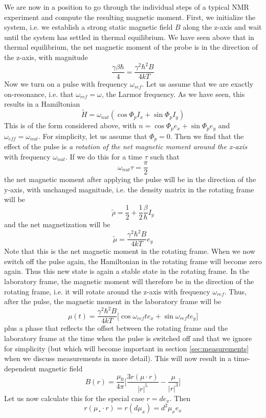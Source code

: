\documentclass[a4paper, draft]{article}
\theoremstyle{own}
\theoremstyle{remark}
\begin{document}
We are now in a position to go through the individual steps of a typical NMR experiment and compute the resulting magnetic moment. First, we initialize the system, i.e. we establish a strong static magnetic field $B$ along the z-axis and wait until the system has settled in thermal equilibrium. We have seen above that in thermal equilibrium, the net magnetic moment of the probe is in the direction of the z-axis, with magnitude
$$
\frac{\gamma \beta \hbar}{4} = \frac{\gamma^2 \hbar^2 B}{4kT} 
$$
Now we turn on a pulse with frequency $\omega_{ref}$. Let us assume that we are exactly on-resonance, i.e. that $\omega_{ref} = \omega$, the Larmor frequency. As we have seen, this results in a Hamiltonian
$$
\widetilde{H} =  \omega_{nut} ( \cos \Phi_p I_x + \sin \Phi_p I_y)
$$
This is of the form considered above, with $n = \cos \Phi_p e_x + \sin \Phi_p e_y$ and $\omega_{eff} = \omega_{nut}$. For simplicity, let us assume that $\Phi_p = 0$. Then we find that the effect of the pulse is {\it a rotation of the net magnetic moment around the x-axis} with frequency $\omega_{nut}$. If we do this for a time $\tau$ such that
$$
\omega_{nut} \tau = \frac{\pi}{2}
$$
the net magnetic moment after applying the pulse will be in the direction of the y-axis, with unchanged magnitude, i.e. the density matrix in the rotating frame will be
$$
\widetilde{\rho} = \frac{1}{2} + \frac{1}{2} \frac{\beta}{\hbar} I_y
$$
and the net magnetization will be 
$$
\tilde{\mu} = \frac{\gamma^2 \hbar^2 B}{4kT}  e_y
$$
Note that this is the net magnetic moment in the rotating frame. When we now switch off the pulse again, the Hamiltonian in the rotating frame will become zero again. Thus this new state is again a stable state in the rotating frame. In the laboratory frame, the magnetic moment will therefore be in the direction of the rotating frame, i.e. it will rotate around the z-axis with frequency $\omega_{ref}$. Thus, after the pulse, the magnetic moment in the laboratory frame will be
$$
\mu(t) = \frac{\gamma^2 \hbar^2 B}{4kT}  \big[ \cos \omega_{ref} t e_x + \sin \omega_{ref}t e_y \big]  
$$
plus a phase that reflects the offset between the rotating frame and the laboratory frame at the time when the pulse is switched off and that we ignore for simplicity (but which will become important in section \ref{sec:measurements} when we discuss measurements in more detail).
This will now result in a time-dependent magnetic field
$$
B(r) = \frac{\mu_0}{4\pi} \big[  \frac{3r(\mu \cdot r)}{|r|^5} - \frac{\mu}{|r|^3}\big] 
$$
Let us now calculate this for the special case $r = d e_x$. Then 
$$
r  (\mu ¸\cdot r) = r  (d \mu_x) = d^2 \mu_x e_x
$$
\end{document}
